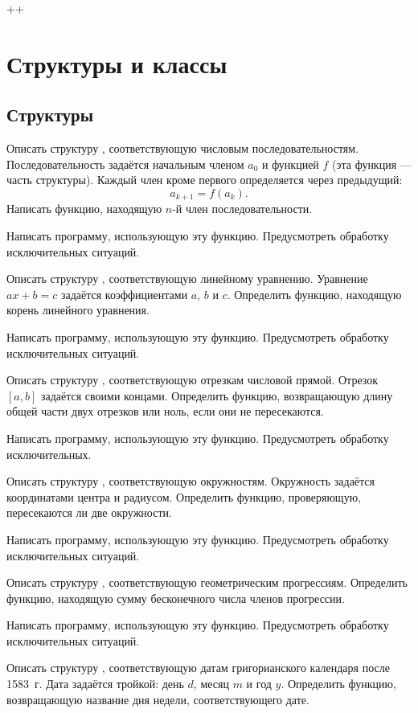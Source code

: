 ++\section{Структуры и классы}

\subsection{Структуры}

\task Описать структуру , соответствующую числовым
последовательностям. Последовательность задаётся начальным членом
$a_0$ и функцией $f$ (эта функция — часть структуры). Каждый член
кроме первого определяется через предыдущий:
\[
a_{k+1} = f(a_k).
\]
Написать функцию, находящую $n$-й член последовательности.

Написать программу, использующую эту функцию. Предусмотреть обработку
исключительных ситуаций.

\task Описать структуру , соответствующую линейному
уравнению. Уравнение $ax+b=c$ задаётся коэффициентами $a$, $b$ и $c$.
Определить функцию, находящую корень линейного уравнения.

Написать программу, использующую эту функцию. Предусмотреть обработку
исключительных ситуаций.

\task Описать структуру , соответствующую отрезкам
числовой прямой. Отрезок $[a, b]$ задаётся своими концами. Определить
функцию, возвращающую длину общей части двух отрезков или ноль, если
они не пересекаются.

Написать программу, использующую эту функцию. Предусмотреть обработку
исключительных.

\task Описать структуру , соответствующую
окружностям. Окружность задаётся координатами центра и
радиусом. Определить функцию, проверяющую, пересекаются ли две
окружности.

Написать программу, использующую эту функцию. Предусмотреть обработку
исключительных ситуаций.

\task Описать структуру , соответствующую
геометрическим прогрессиям. Определить функцию, находящую сумму
бесконечного числа членов прогрессии.

Написать программу, использующую эту функцию. Предусмотреть обработку
исключительных ситуаций.

\task Описать структуру , соответствующую датам
григорианского календаря после 1583~г. Дата задаётся тройкой: день
$d$, месяц $m$ и год $y.$ Определить функцию, возвращающую название
дня недели, соответствующего дате.

